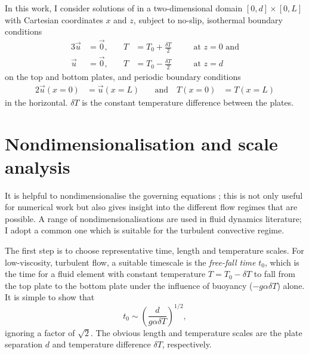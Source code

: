 \documentclass[../main.tex]{subfiles}
\begin{document}
In this work, I consider solutions of
 in a two-dimensional
domain $[0, d] \times [0, L]$ with Cartesian coordinates $x$ and $z$, subject
to no-slip, isothermal boundary conditions
\begin{alignat}{3}
    \label{eqn:dim_bc_bot}
    \vec{u} &= \vec{0}, &\quad T &= T_0 + \frac{\delta T}{2} &\quad& \text{at
    } z = 0 \text{ and} \\
    \label{eqn:dim_bc_top}
    \vec{u} &= \vec{0}, &\quad T &= T_0 - \frac{\delta T}{2} &\quad& \text{at
    } z = d
\end{alignat}
on the top and bottom plates, and periodic boundary conditions
\begin{alignat}{2}
    \label{eqn:dim_bc_sides}
    \vec{u}(x=0) &= \vec{u}(x=L) &\quad \text{and} \quad T(x=0) &= T(x=L)
\end{alignat}
in the horizontal. $\delta T$ is the constant temperature difference between
the plates.

\section{Nondimensionalisation and scale analysis}
It is helpful to nondimensionalise the governing equations
; this is not only useful for
numerical work but also gives insight into the different flow regimes that are
possible. A range of nondimensionalisations are used in fluid dynamics
literature; I adopt a common one \parencite[see,
e.g.,][]{grotzbach1983,ouertatani2008,stevens2010} which is suitable for the
turbulent convective regime.

The first step is to choose representative time, length and temperature scales.
For low-viscosity, turbulent flow, a suitable timescale is the \emph{free-fall
time} $t_0$, which is the time for a fluid element with constant temperature $T
= T_0 - \delta T$ to fall from the top plate to the bottom plate under the
influence of buoyancy ($-g \alpha \delta T$) alone. It is simple to show that
\[
    t_0 \sim \left( \frac{d}{g \alpha \delta T} \right)^{1/2},
\]
ignoring a factor of $\sqrt{2}$. The obvious length and temperature scales are
the plate separation $d$ and temperature difference $\delta T$, respectively.
\end{document}
